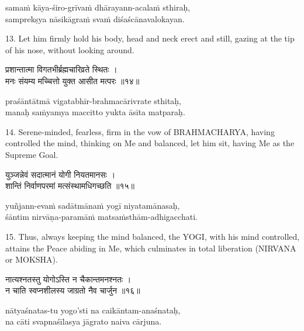 \begin{transliteration}
samaṁ kāya-śiro-grīvaṁ dhārayann-acalaṁ sthiraḥ, \\
samprekṣya nāsikāgraṁ svaṁ diśaścānavalokayan.
\end{transliteration}

13. Let him firmly hold his body, head and neck erect and still, gazing at the
tip of his nose, without looking around.

\begin{gitaverse}
प्रशान्तात्मा विगतभीर्ब्रह्मचारिव्रते स्थितः । \\
मनः संयम्य मच्चित्तो युक्त आसीत मत्परः ॥१४॥
\end{gitaverse}

\begin{transliteration}
praśāntātmā vigatabhīr-brahmacārivrate sthitaḥ, \\
manaḥ saṁyamya maccitto yukta āsīta matparaḥ.
\end{transliteration}

14. Serene-minded, fearless, firm in the vow of BRAHMACHARYA, having controlled
the mind, thinking on Me and balanced, let him sit, having Me as the Supreme
Goal.

\begin{gitaverse}
युञ्जन्नेवं सदात्मानं योगी नियतमानसः । \\
शान्तिं निर्वाणपरमां मत्संस्थामधिगच्छति ॥१५॥
\end{gitaverse}

\begin{transliteration}
yuñjann-evaṁ sadātmānaṁ yogī niyatamānasaḥ, \\
śāntim nirvāṇa-paramāṁ matsaṁsthām-adhigacchati.
\end{transliteration}

15. Thus, always keeping the mind balanced, the YOGI, with his mind controlled,
attains the Peace abiding in Me, which culminates in total liberation (NIRVANA
or MOKSHA).

\begin{gitaverse}
नात्यश्नतस्तु योगोऽस्ति न चैकान्तमनश्नतः । \\
न चाति स्वप्नशीलस्य जाग्रतो नैव चार्जुन ॥१६॥
\end{gitaverse}

\begin{transliteration}
nātyaśnatas-tu yogo'sti na caikāntam-anaśnataḥ, \\
na cāti svapnaśīlasya jāgrato naiva cārjuna.
\end{transliteration}

